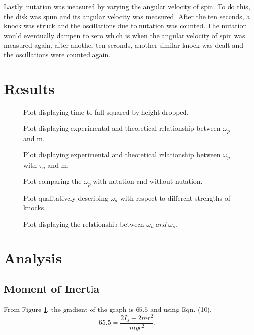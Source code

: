 \documentclass{article}
\begin{document}
Lastly, nutation was measured by varying the angular velocity of spin. To do this, the disk
was spun and its angular velocity was measured. After the ten seconds, a knock was struck and 
the oscillations due to nutation was counted. The nutation would eventually dampen to zero which 
is when the angular velocity of spin was measured again, after another ten seconds, another
similar knock was dealt and the oscillations were counted again.

\section{Results}
\begin{figure}[H]
    \centering
    \scalebox{0.75}{}
    \caption{Plot displaying time to fall squared by height dropped.}
    \label{fig:plot1}
\end{figure}
\begin{figure}[H]
    \centering
    \scalebox{0.75}{}
    \caption{Plot displaying experimental and theoretical relationship between $\omega_p$ and m.}
    \label{fig:plot2}
\end{figure}
\begin{figure}[H]
    \centering
    \scalebox{0.75}{}
    \caption{Plot displaying experimental and theoretical relationship between $\omega_p$ with $\tau_n$ and m.}
    \label{fig:plot3}
\end{figure}
\begin{figure}[H]
    \centering
    \scalebox{0.75}{}
    \caption{Plot comparing the $\omega_p$ with nutation and without nutation.}
    \label{fig:plot4}
\end{figure}
\begin{figure}[H]
    \centering
    \scalebox{0.75}{}
    \caption{Plot qualitatively describing $\omega_n$ with respect to different strengths of knocks.}
    \label{fig:plot5}
\end{figure}
\begin{figure}[H]
    \centering
    \scalebox{0.75}{}
    \caption{Plot displaying the relationship between $\omega_n \: and \: \omega_s$.}
    \label{fig:plot6}
\end{figure}

\section{Analysis}
\subsection{Moment of Inertia}
From Figure \ref{fig:plot1}, the gradient of the graph is $65.5$ and using Eqn. (10),
\begin{equation}
    65.5 = \frac{2I_s+2mr^2}{mgr^2}.
\end{equation}
\end{document}
